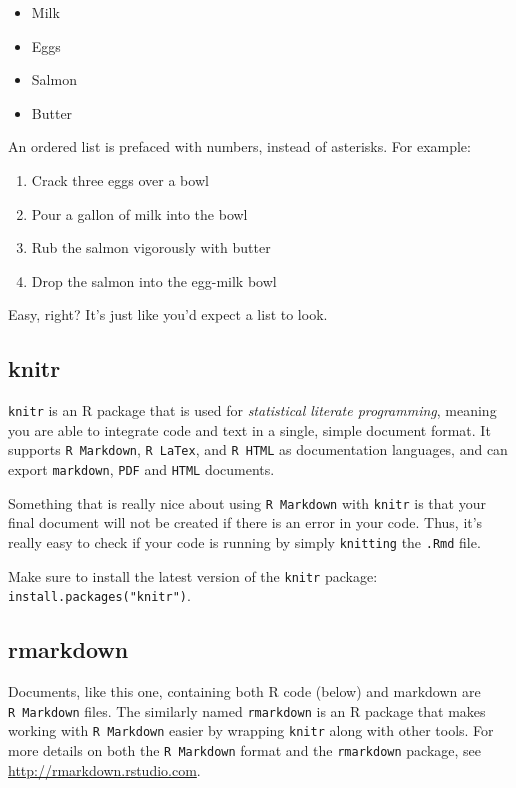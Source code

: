 \documentclass[
]{article}
\providecommand{\tightlist}{%
  \setlength{\itemsep}{0pt}\setlength{\parskip}{0pt}}
\begin{document}
\begin{itemize}
\tightlist
\item
  Milk
\item
  Eggs
\item
  Salmon
\item
  Butter
\end{itemize}

An ordered list is prefaced with numbers, instead of asterisks. For
example:

\begin{enumerate}
\def\labelenumi{\arabic{enumi}.}
\tightlist
\item
  Crack three eggs over a bowl
\item
  Pour a gallon of milk into the bowl
\item
  Rub the salmon vigorously with butter
\item
  Drop the salmon into the egg-milk bowl
\end{enumerate}

Easy, right? It's just like you'd expect a list to look.

\hypertarget{knitr}{%
\subsection{knitr}\label{knitr}}

\texttt{knitr} is an R package that is used for \emph{statistical
literate programming}, meaning you are able to integrate code and text
in a single, simple document format. It supports \texttt{R\ Markdown},
\texttt{R\ LaTex}, and \texttt{R\ HTML} as documentation languages, and
can export \texttt{markdown}, \texttt{PDF} and \texttt{HTML} documents.

Something that is really nice about using \texttt{R\ Markdown} with
\texttt{knitr} is that your final document will not be created if there
is an error in your code. Thus, it's really easy to check if your code
is running by simply \texttt{knitting} the \texttt{.Rmd} file.

Make sure to install the latest version of the \texttt{knitr} package:
\texttt{install.packages("knitr")}.

\hypertarget{rmarkdown}{%
\subsection{rmarkdown}\label{rmarkdown}}

Documents, like this one, containing both R code (below) and markdown
are \texttt{R\ Markdown} files. The similarly named \texttt{rmarkdown}
is an R package that makes working with \texttt{R\ Markdown} easier by
wrapping \texttt{knitr} along with other tools. For more details on both
the \texttt{R\ Markdown} format and the \texttt{rmarkdown} package, see
\url{http://rmarkdown.rstudio.com}.
\end{document}
